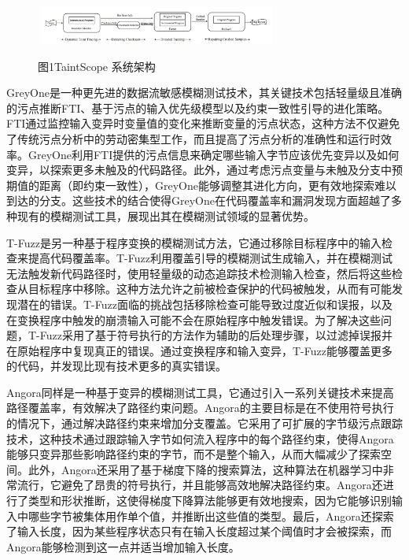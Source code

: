 \documentclass[10.5pt,compsoc]{CjC}
\theoremstyle{mystyle}
\begin{document}
\begin{figure}[htbp]
  \centerline{\includegraphics[width=3.15in,height=0.5in]{./image/TaintScope.png}}
  \begin{center}
    图1\quad  TaintScope 系统架构\cite{TaintScope}
  \end{center}
  \label{fig1}
\end{figure}

GreyOne\cite{GREYONE}是一种更先进的数据流敏感模糊测试技术，其关键技术包括轻量级且准确的污点推断FTI、基于污点的输入优先级模型以及约束一致性引导的进化策略。FTI通过监控输入变异时变量值的变化来推断变量的污点状态，这种方法不仅避免了传统污点分析中的劳动密集型工作，而且提高了污点分析的准确性和运行时效率。GreyOne利用FTI提供的污点信息来确定哪些输入字节应该优先变异以及如何变异，以探索更多未触及的代码路径。此外，通过考虑污点变量与未触及分支中预期值的距离（即约束一致性），GreyOne能够调整其进化方向，更有效地探索难以到达的分支。这些技术的结合使得GreyOne在代码覆盖率和漏洞发现方面超越了多种现有的模糊测试工具，展现出其在模糊测试领域的显著优势。

T-Fuzz\cite{T-Fuzz}是另一种基于程序变换的模糊测试方法，它通过移除目标程序中的输入检查来提高代码覆盖率。T-Fuzz利用覆盖引导的模糊测试生成输入，并在模糊测试无法触发新代码路径时，使用轻量级的动态追踪技术检测输入检查，然后将这些检查从目标程序中移除。这种方法允许之前被检查保护的代码被触发，从而有可能发现潜在的错误。T-Fuzz面临的挑战包括移除检查可能导致过度近似和误报，以及在变换程序中触发的崩溃输入可能不会在原始程序中触发错误。为了解决这些问题，T-Fuzz采用了基于符号执行的方法作为辅助的后处理步骤，以过滤掉误报并在原始程序中复现真正的错误。通过变换程序和输入变异，T-Fuzz能够覆盖更多的代码，并发现比现有技术更多的真实错误。

Angora\cite{angora}同样是一种基于变异的模糊测试工具，它通过引入一系列关键技术来提高路径覆盖率，有效解决了路径约束问题。Angora的主要目标是在不使用符号执行的情况下，通过解决路径约束来增加分支覆盖。它采用了可扩展的字节级污点跟踪技术，这种技术通过跟踪输入字节如何流入程序中的每个路径约束，使得Angora能够只变异那些影响路径约束的字节，而不是整个输入，从而大幅减少了探索空间。此外，Angora还采用了基于梯度下降的搜索算法，这种算法在机器学习中非常流行，它避免了昂贵的符号执行，并且能够高效地解决路径约束。Angora还进行了类型和形状推断，这使得梯度下降算法能够更有效地搜索，因为它能够识别输入中哪些字节被集体用作单个值，并推断出这些值的类型。最后，Angora还探索了输入长度，因为某些程序状态只有在输入长度超过某个阈值时才会被探索，而Angora能够检测到这一点并适当增加输入长度。
\vspace {10mm}
\end{document}
